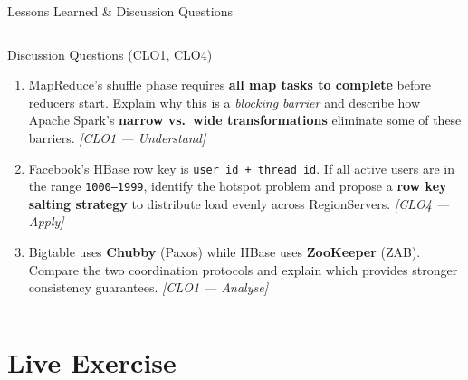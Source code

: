 \documentclass[aspectratio=169,10pt]{beamer}
\begin{document}
\begin{frame}{Lessons Learned \& Discussion Questions}
\begin{columns}[T]
      \begin{alertblock}{Discussion Questions \textmd{\tiny (CLO1, CLO4)}}
        \begin{enumerate}
          \item MapReduce's shuffle phase requires \textbf{all map tasks
                to complete} before reducers start.
                Explain why this is a \emph{blocking barrier} and
                describe how Apache Spark's \textbf{narrow vs.\ wide
                transformations} eliminate some of these barriers.
                \textit{[CLO1 — Understand]}
          \item Facebook's HBase row key is
                \texttt{user\_id + thread\_id}.
                If all active users are in the range
                \texttt{1000–1999}, identify the hotspot problem
                and propose a \textbf{row key salting strategy}
                to distribute load evenly across RegionServers.
                \textit{[CLO4 — Apply]}
          \item Bigtable uses \textbf{Chubby} (Paxos) while HBase
                uses \textbf{ZooKeeper} (ZAB).
                Compare the two coordination protocols and explain
                which provides stronger consistency guarantees.
                \textit{[CLO1 — Analyse]}
        \end{enumerate}
      \end{alertblock}
  \end{columns}
\end{frame}

\section{Live Exercise}
\end{document}

